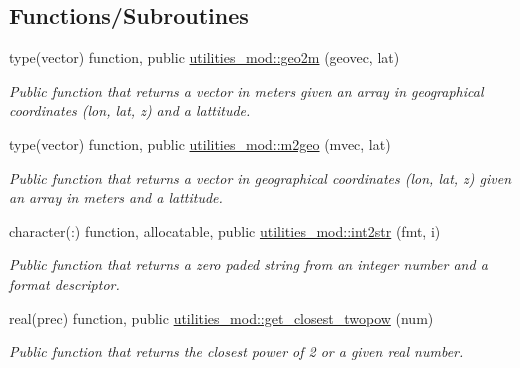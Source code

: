\subsection*{Functions/\+Subroutines}
\begin{DoxyCompactItemize}
\item 
type(vector) function, public \mbox{\hyperlink{namespaceutilities__mod_a415de70150d626b1e8c6e0c8c0e09e8b}{utilities\+\_\+mod\+::geo2m}} (geovec, lat)
\begin{DoxyCompactList}\small\item\em Public function that returns a vector in meters given an array in geographical coordinates (lon, lat, z) and a lattitude. \end{DoxyCompactList}\item 
type(vector) function, public \mbox{\hyperlink{namespaceutilities__mod_ac4f9ec7e3dc3683a4e79e462d89a90b9}{utilities\+\_\+mod\+::m2geo}} (mvec, lat)
\begin{DoxyCompactList}\small\item\em Public function that returns a vector in geographical coordinates (lon, lat, z) given an array in meters and a lattitude. \end{DoxyCompactList}\item 
character(\+:) function, allocatable, public \mbox{\hyperlink{namespaceutilities__mod_ab414aa8d1299fc8dfb5941113d050dd3}{utilities\+\_\+mod\+::int2str}} (fmt, i)
\begin{DoxyCompactList}\small\item\em Public function that returns a zero paded string from an integer number and a format descriptor. \end{DoxyCompactList}\item 
real(prec) function, public \mbox{\hyperlink{namespaceutilities__mod_a683f93677348e11d331c1c37c66caf7a}{utilities\+\_\+mod\+::get\+\_\+closest\+\_\+twopow}} (num)
\begin{DoxyCompactList}\small\item\em Public function that returns the closest power of 2 or a given real number. \end{DoxyCompactList}\end{DoxyCompactItemize}
